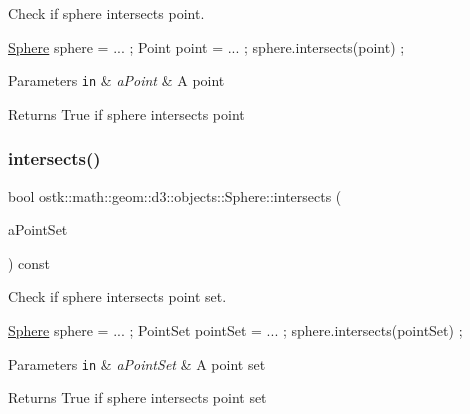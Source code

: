 Check if sphere intersects point. 


\begin{DoxyCode}
\hyperlink{classostk_1_1math_1_1geom_1_1d3_1_1objects_1_1_sphere_a6920f72260a7b2c9ffc29283540e16c2}{Sphere} sphere = ... ;
Point point = ... ;
sphere.intersects(point) ;
\end{DoxyCode}



\begin{DoxyParams}[1]{Parameters}
\mbox{\tt in}  & {\em a\+Point} & A point \\
\hline
\end{DoxyParams}
\begin{DoxyReturn}{Returns}
True if sphere intersects point 
\end{DoxyReturn}
\mbox{\label{classostk_1_1math_1_1geom_1_1d3_1_1objects_1_1_sphere_a265e91ed533996623854629ac26ee080}} 
\subsubsection{\texorpdfstring{intersects()}{intersects()}\hspace{0.1cm}{\footnotesize\ttfamily [2/9]}}
{\footnotesize\ttfamily bool ostk\+::math\+::geom\+::d3\+::objects\+::\+Sphere\+::intersects (\begin{DoxyParamCaption}\item[{const \hyperlink{classostk_1_1math_1_1geom_1_1d3_1_1objects_1_1_point_set}{Point\+Set} \&}]{a\+Point\+Set }\end{DoxyParamCaption}) const}



Check if sphere intersects point set. 


\begin{DoxyCode}
\hyperlink{classostk_1_1math_1_1geom_1_1d3_1_1objects_1_1_sphere_a6920f72260a7b2c9ffc29283540e16c2}{Sphere} sphere = ... ;
PointSet pointSet = ... ;
sphere.intersects(pointSet) ;
\end{DoxyCode}



\begin{DoxyParams}[1]{Parameters}
\mbox{\tt in}  & {\em a\+Point\+Set} & A point set \\
\hline
\end{DoxyParams}
\begin{DoxyReturn}{Returns}
True if sphere intersects point set 
\end{DoxyReturn}
\mbox{\label{classostk_1_1math_1_1geom_1_1d3_1_1objects_1_1_sphere_a26c5a18cb7543734fb74cad966f512f8}} 
